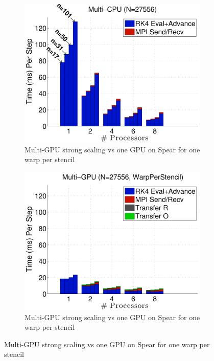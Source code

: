 \begin{figure}
\centering
\begin{subfigure}[t]{0.425\textwidth}
\centering
\includegraphics[width=1.0\textwidth]{../figures/spear_results/vortex/multiCPU_costs-eps-converted-to.pdf}
\caption{Multi-GPU strong scaling vs one GPU on Spear for one warp per stencil}
\label{fig:alltoall_multigpu_vs_gpu_scaling}
\end{subfigure} 
\begin{subfigure}[t]{0.425\textwidth}
\centering
\includegraphics[width=1.0\textwidth]{../figures/spear_results/vortex/multiGPU_warp_costs-eps-converted-to.pdf}
\caption{Multi-GPU strong scaling vs one GPU on Spear for one warp per stencil}
\label{fig:alltoall_multigpu_vs_gpu_scaling}
\end{subfigure} 
\end{figure} 




